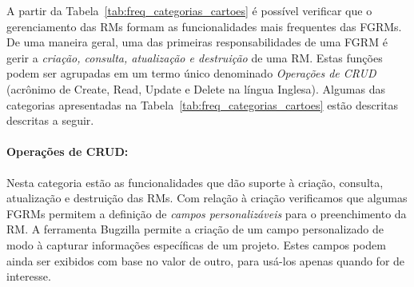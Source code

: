 \begin{table}[htpb]
\centering
{}
\caption{Frequência de cada categoria de funcionalidade no conjunto de cartões
	obtidos.}
\label{tab:freq_categorias_cartoes}
\end{table}

A partir da Tabela~\ref{tab:freq_categorias_cartoes} é possível verificar que o
gerenciamento das RMs formam as funcionalidades mais frequentes das FGRMs\@. De
uma maneira geral, uma das primeiras responsabilidades de uma FGRM é gerir a
\textit{criação, consulta, atualização e destruição} de uma RM\@. Estas funções
podem ser agrupadas em um termo único denominado \textit{Operações de CRUD}
(acrônimo de Create, Read, Update e Delete na língua Inglesa). Algumas das
categorias apresentadas na Tabela~\ref{tab:freq_categorias_cartoes} estão
descritas descritas a seguir.

\paragraph{Operações de CRUD:}
\label{par:operações_de_crud}

Nesta categoria estão as funcionalidades que dão suporte à criação,	consulta,
atualização e destruição das RMs. Com relação à criação verificamos que algumas
FGRMs permitem a definição de \textit{campos personalizáveis} para o
preenchimento da RM\@. A ferramenta Bugzilla permite a criação de um campo
personalizado de modo à capturar informações específicas de um projeto. Estes
campos podem ainda ser exibidos com base no valor de outro, para usá-los apenas
quando for de interesse.

